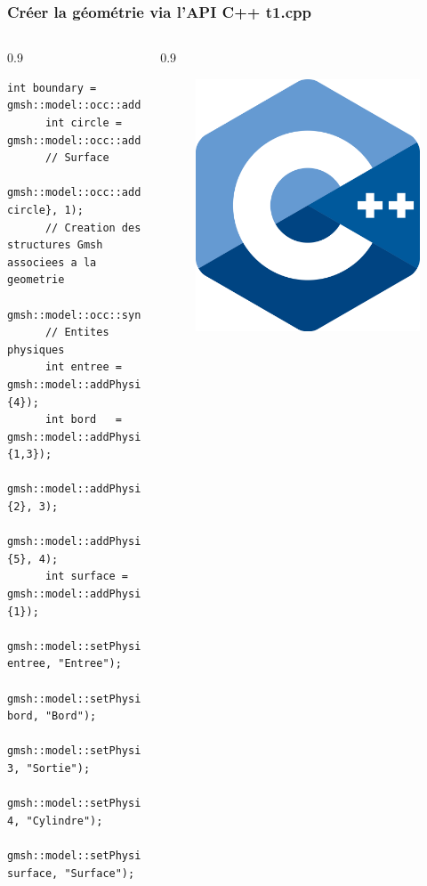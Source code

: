 \documentclass[aspectratio=169]{beamer}
\begin{document}
\begin{frame}[fragile]
\frametitle{Créer la géométrie via l'API C++ \hfill t1.cpp}
  \footnotesize
  \begin{columns}
    \begin{column}{0.9\linewidth}
    \begin{lstlisting}[frame=none, aboveskip=1mm]
      int boundary = gmsh::model::occ::addCurveLoop({l1,l2,l3,l4});
      int circle = gmsh::model::occ::addCurveLoop({c1});
      // Surface
      gmsh::model::occ::addPlaneSurface({boundary, circle}, 1);
      // Creation des structures Gmsh associees a la geometrie
      gmsh::model::occ::synchronize();
      // Entites physiques
      int entree = gmsh::model::addPhysicalGroup(1, {4});
      int bord   = gmsh::model::addPhysicalGroup(1, {1,3});
      gmsh::model::addPhysicalGroup(1, {2}, 3);
      gmsh::model::addPhysicalGroup(1, {5}, 4);
      int surface = gmsh::model::addPhysicalGroup(2, {1});
      gmsh::model::setPhysicalName(1, entree, "Entree");
      gmsh::model::setPhysicalName(1, bord, "Bord");
      gmsh::model::setPhysicalName(1, 3, "Sortie");
      gmsh::model::setPhysicalName(1, 4, "Cylindre");
      gmsh::model::setPhysicalName(2, surface, "Surface");
    \end{lstlisting}
    \end{column}
    \begin{column}{0.9\linewidth}
      \begin{figure}
        \vspace{-5.5cm}
        \hspace{-8cm}
        \includegraphics[width=0.1\linewidth]{figures/cpp.png}
        \caption{}
        \label{}
      \end{figure}
    \end{column}
  \end{columns}
\end{frame}
\end{document}
